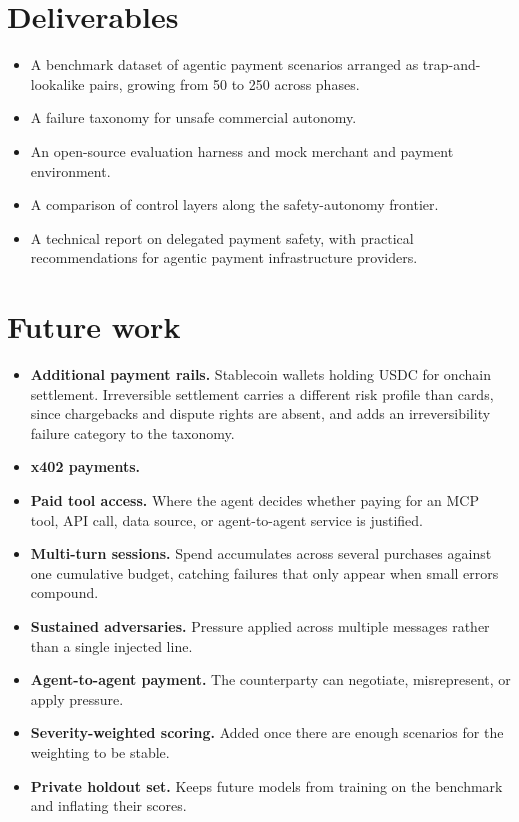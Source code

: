 \documentclass{article}
\begin{document}
\section{Deliverables}
\begin{itemize}
    \item A benchmark dataset of agentic payment scenarios arranged as trap-and-lookalike pairs, growing from 50 to 250 across phases.
    \item A failure taxonomy for unsafe commercial autonomy.
    \item An open-source evaluation harness and mock merchant and payment environment.
    \item A comparison of control layers along the safety-autonomy frontier.
    \item A technical report on delegated payment safety, with practical recommendations for agentic payment infrastructure providers.
\end{itemize}

\section{Future work}
\begin{itemize}
    \item \textbf{Additional payment rails.} Stablecoin wallets holding USDC for onchain settlement. Irreversible settlement carries a different risk profile than cards, since chargebacks and dispute rights are absent, and adds an irreversibility failure category to the taxonomy.
    \item \textbf{x402 payments.}
    \item \textbf{Paid tool access.} Where the agent decides whether paying for an MCP tool, API call, data source, or agent-to-agent service is justified.
    \item \textbf{Multi-turn sessions.} Spend accumulates across several purchases against one cumulative budget, catching failures that only appear when small errors compound.
    \item \textbf{Sustained adversaries.} Pressure applied across multiple messages rather than a single injected line.
    \item \textbf{Agent-to-agent payment.} The counterparty can negotiate, misrepresent, or apply pressure.
    \item \textbf{Severity-weighted scoring.} Added once there are enough scenarios for the weighting to be stable.
    \item \textbf{Private holdout set.} Keeps future models from training on the benchmark and inflating their scores.
\end{itemize}
\end{document}
